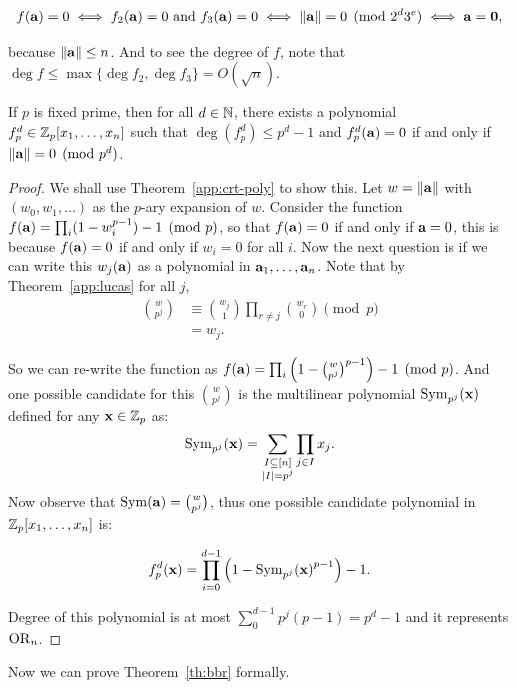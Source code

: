 \[
    f(\mathbf{a}) = 0 \iff f_2(\mathbf{a}) = 0 \text{ and } f_3(\mathbf{a}) = 0 \iff \|\mathbf{a}\| = 0 \pmod{2^d3^e}  \iff \mathbf{a} = \mathbf{0},
\]

because $\|\mathbf{a}\|\leq n$. And to see the degree of $f$, note that $\deg f\leq \max\{\deg f_2, \deg f_3\} = O(\sqrt{n})$.

\begin{greybox}
    \begin{lemma}\label{lem:prime poly}
        If $p$ is fixed prime, then for all $d\in\mathbb{N}$, there exists a polynomial $f_p^d\in\mathbb{Z}_p[x_1,\ldots,x_n]$ such that $\deg(f_p^d)\leq p^d - 1$ and $f_p^d(\mathbf{a}) = 0$ if and only if $\|\mathbf{a}\| = 0\pmod{p^d}$.
    \end{lemma}
\end{greybox}
\begin{proof}
    We shall use Theorem~\ref{app:crt-poly} to show this. Let $w = \|\mathbf{a}\|$ with $(w_0,w_1,\ldots)$ as the $p$-ary expansion of $w$. Consider the function $f(\mathbf{a}) = \prod_i(1 - w_i^{p-1}) - 1 \pmod p $, so that $f(\mathbf{a}) = 0$ if and only if $\mathbf{a} = 0$, this is because $f(\mathbf{a}) = 0$ if and only if $w_i = 0$ for all $i$. Now the next question is if we can write this $w_j(\mathbf{a})$ as a polynomial in $\mathbf{a}_1,\ldots,\mathbf{a}_n$. Note that by Theorem~\ref{app:lucas} for all $j$, 
    \begin{align*}
        \binom{w}{p^j} 
        & \equiv \binom{w_j}{1}\prod_{r\neq j}\binom{w_r}{0} \pmod{p}\\
        & = w_j.
    \end{align*}

    So we can re-write the function as $f(\mathbf{a}) = \prod_i\left(1 - {\binom{w}{p^j}}^{p-1}\right) - 1\pmod p$. And one possible candidate for this $\binom{w}{p^j}$ is the multilinear polynomial $\operatorname{Sym}_{p^j}(\mathbf{x})$ defined for any $\mathbf{x}\in\mathbb{Z}_p$ as:
    \[
       \operatorname{Sym}_{p^j}(\mathbf{x}) = \sum_{\substack{I\subseteq[n]\\|I| = p^j}}\prod_{j\in I}x_j.
    \]
    Now observe that $\operatorname{Sym}(\mathbf{a}) = \binom{w}{p^j}$, thus one possible candidate polynomial in $\mathbb{Z}_p[x_1,\ldots,x_n]$ is:

    \[
        f_p^d(\mathbf{x}) = \prod_{i=0}^{d-1}\left(1 - {\operatorname{Sym}_{p^j}(\mathbf{x})}^{p-1}\right) - 1.
    \]

    Degree of this polynomial is at most $\sum_0^{d-1}p^j(p-1) = p^d-1$ and it represents $\operatorname{OR}_n$.
\end{proof}

Now we can prove Theorem~\ref{th:bbr} formally.

